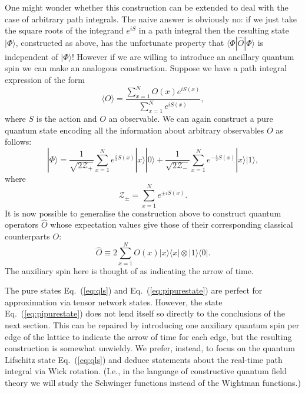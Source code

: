 \documentclass[twocolumn,lengthcheck,superscriptaddress]{revtex4-1}
\theoremstyle{definition}
\theoremstyle{remark}
\begin{document}
One might wonder whether this construction can be extended to deal with the case of arbitrary path integrals. The naive answer is obviously no: if we just take the square roots of the integrand $e^{iS}$ in a path integral then the resulting state $|\Phi\rangle$, constructed as above, has the unfortunate property that $\langle \Phi| \widehat{O}|\Phi\rangle$ is independent of $|\Phi\rangle$! However if we are willing to introduce an ancillary quantum spin we can make an analogous construction. Suppose we have a path integral expression of the form 
\begin{equation}
	\langle O \rangle = \frac{\sum_{x=1}^N O(x) e^{iS(x)}}{\sum_{x=1}^N e^{iS(x)}},
\end{equation}
where $S$ is the action and $O$ an observable. We can again construct a pure quantum state encoding all the information about arbitrary observables $O$ as follows:
\begin{equation}\label{eq:pipurestate}
	|\Phi\rangle = \frac{1}{\sqrt{2\mathcal{Z_+}}}\sum_{x=1}^N e^{\frac{i}{2}S(x)} |x\rangle|0\rangle + \frac{1}{\sqrt{2\mathcal{Z_-}}}\sum_{x=1}^N e^{-\frac{i}{2}S(x)} |x\rangle|1\rangle,
\end{equation}
where
\begin{equation}
	\mathcal{Z_\pm} = \sum_{x=1}^N e^{\pm iS(x)}.
\end{equation}
It is now possible to generalise the construction above to construct quantum operators $\widehat{O}$ whose expectation values give those of their corresponding classical counterparts $O$:
\begin{equation}
	\widehat{O} \equiv 2\sum_{x=1}^N O(x) |x\rangle\langle x|\otimes |1\rangle\langle 0|.
\end{equation}
The auxiliary spin here is thought of as indicating the arrow of time.

The pure states Eq.~(\ref{eq:qls}) and Eq.~(\ref{eq:pipurestate}) are perfect for approximation via tensor network states. However, the state Eq.~(\ref{eq:pipurestate}) does not lend itself so directly to the conclusions of the next section. This can be repaired by introducing one auxiliary quantum spin per edge of the lattice to indicate the arrow of time for each edge, but the resulting construction is somewhat unwieldy. We prefer, instead, to focus on the quantum Lifschitz state Eq.~(\ref{eq:qls}) and deduce statements about the real-time path integral via Wick rotation. (I.e., in the language of constructive quantum field theory we will study the Schwinger functions instead of the Wightman functions.)
\end{document}
